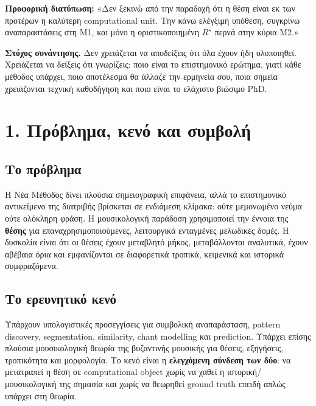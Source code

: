 \documentclass[9pt,a4paper]{extarticle}
\newcommand{\say}[1]{\begin{keybox}\textbf{Προφορική διατύπωση:} #1\end{keybox}}
\begin{document}
\say{«Δεν ξεκινώ από την παραδοχή ότι η θέση είναι εκ των προτέρων η καλύτερη computational unit. Την κάνω ελέγξιμη υπόθεση, συγκρίνω αναπαραστάσεις στη M1, και μόνο η οριστικοποιημένη \(R^\star\) περνά στην κύρια M2.»}

\begin{warnbox}
\textbf{Στόχος συνάντησης.} Δεν χρειάζεται να αποδείξεις ότι όλα έχουν ήδη υλοποιηθεί. Χρειάζεται να δείξεις ότι γνωρίζεις: ποιο είναι το επιστημονικό ερώτημα, γιατί κάθε μέθοδος υπάρχει, ποιο αποτέλεσμα θα άλλαζε την ερμηνεία σου, ποια σημεία χρειάζονται τεχνική καθοδήγηση και ποιο είναι το ελάχιστο βιώσιμο PhD.
\end{warnbox}

\newpage
\section*{1. Πρόβλημα, κενό και συμβολή}

\subsection*{Το πρόβλημα}
Η Νέα Μέθοδος δίνει πλούσια σημειογραφική επιφάνεια, αλλά το επιστημονικό αντικείμενο της διατριβής βρίσκεται σε ενδιάμεση κλίμακα: ούτε μεμονωμένο νεύμα ούτε ολόκληρη φράση. Η μουσικολογική παράδοση χρησιμοποιεί την έννοια της \textbf{θέσης} για επαναχρησιμοποιούμενες, λειτουργικά ενταγμένες μελωδικές δομές. Η δυσκολία είναι ότι οι θέσεις έχουν μεταβλητό μήκος, μεταβάλλονται αναλυτικά, έχουν αβέβαια όρια και εμφανίζονται σε διαφορετικά τροπικά, κειμενικά και ιστορικά συμφραζόμενα.

\subsection*{Το ερευνητικό κενό}
Υπάρχουν υπολογιστικές προσεγγίσεις για συμβολική αναπαράσταση, pattern discovery, segmentation, similarity, chant modelling και prediction. Υπάρχει επίσης πλούσια μουσικολογική θεωρία της βυζαντινής μουσικής για θέσεις, εξηγήσεις, τροπικότητα και μορφολογία. Το κενό είναι η \textbf{ελεγχόμενη σύνδεση των δύο}: να μετατραπεί η θέση σε computational object χωρίς να χαθεί η ιστορική/μουσικολογική της σημασία και χωρίς να θεωρηθεί ground truth επειδή απλώς υπάρχει στη θεωρία.
\end{document}
